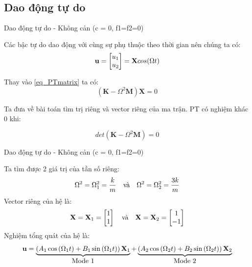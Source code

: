 \documentclass[aspectratio=169, t]{beamer} %
\begin{document}
\subsection{Dao động tự do}
\begin{frame}{Dao động tự do - Không cản (c = 0, f1=f2=0)}

\vspace{7mm}

Các bậc tự do dao động với cùng sự phụ thuộc theo thời gian nên chúng ta có:
\begin{equation}
    {\bf u} = \begin{bmatrix}
        u_1 \\ u_2
    \end{bmatrix} = {\bf X}cos(\Omega t)
\end{equation}

Thay vào \ref{eq_PTmatrix} ta có:
\begin{equation}
    (\mathbf{K}-\Omega^2 \mathbf{M})\mathbf{X}=0
\end{equation}

Ta đưa về bài toán tìm trị riêng và vector riêng của ma trận. PT có nghiệm khác 0 khi:

\begin{equation}
    det(\mathbf{K}-\Omega^2 \mathbf{M}) = 0
\end{equation}

\end{frame}

\begin{frame}{Dao động tự do - Không cản (c = 0, f1=f2=0)}

Ta tìm được 2 giá trị của tần số riêng:
\begin{equation}
    \Omega^2 =  \Omega_1^2 = \frac{k}{m} \quad \hbox{và} \quad \Omega^2 = \Omega_2^2 = \frac{3k}{m}
\end{equation}
Vector riêng của hệ là:
\begin{equation}
    {\bf X} = {\bf X}_1 = \begin{bmatrix}
        1 \\ 1
    \end{bmatrix} \quad \hbox{và} \quad {\bf X} = {\bf X}_2 = \begin{bmatrix}
        1 \\ -1
    \end{bmatrix}
\end{equation}
Nghiệm tổng quát của hệ là:
\begin{equation}
    {\bf u}=\underbrace{\left(A_1 \cos \left(\Omega_1 t\right)+B_1 \sin \left(\Omega_1 t\right)\right) {\bf X}_1}_{\hbox{Mode 1}}+\underbrace{\left(A_2 \cos \left(\Omega_2 t\right)+B_2 \sin \left(\Omega_2 t\right)\right) {\bf X}_2}_{\hbox{Mode 2}}
\end{equation}  
\end{frame}
\end{document}
